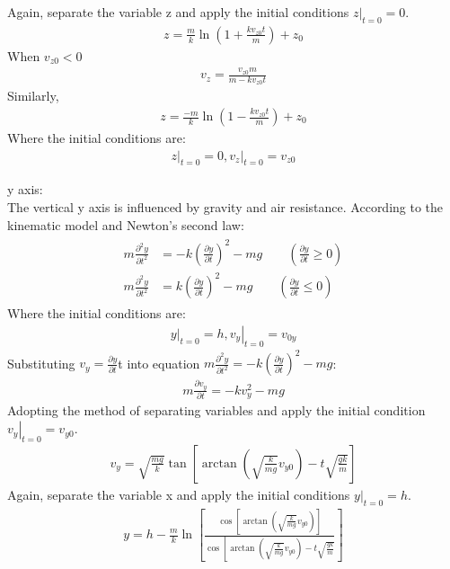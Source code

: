 Again, separate the variable z and apply the initial conditions $\left.z\right|_{t=0}=0$.
\begin{align}
     z=\frac{m}{k} \ln \left(1+\frac{k v_{z 0} t}{m}\right)+z_{0}   
\end{align}
When $v_{z 0}<0$
\begin{align}
    v_{z}=\frac{v_{z 0} m}{m-k v_{z 0} t}
\end{align}
Similarly,
\begin{align}
    z=\frac{-m}{k} \ln \left(1-\frac{k v_{z 0} t}{m}\right)+z_{0}
\end{align}
Where the initial conditions are:
\begin{align}
    \left.z\right|_{t=0}=0,\left.v_{z}\right|_{t=0}=v_{z 0}
\end{align}

y axis:\\
The vertical y axis is influenced by gravity and air resistance. According to the kinematic model and Newton’s second law:
\begin{align}
\begin{split}
   m \frac{\partial^{2} y}{\partial t^{2}}&=-k\left(\frac{\partial y}{\partial t}\right)^{2}-m g\qquad(\frac{\partial y}{\partial t} \geq 0)\\
   m \frac{\partial^{2} y}{\partial t^{2}}&=k\left(\frac{\partial y}{\partial t}\right)^{2}-m g\qquad(\frac{\partial y}{\partial t} \leq 0)
\end{split}
\end{align}
Where the initial conditions are:
\begin{align}
    \left.y\right|_{t=0}=h,\left.v_{y}\right|_{t=0}=v_{0 y}
\end{align}
Substituting $v_{y}=\frac{\partial y}{\partial t}$t into equation $m \frac{\partial^{2} y}{\partial t^{2}}=-k\left(\frac{\partial y}{\partial t}\right)^{2}-m g$:
\begin{align}
    m \frac{\partial v_{y}}{\partial t}=-k v_{y}^{2}-m g
\end{align}
Adopting the method of separating variables and apply the initial condition $\left.v_{y}\right|_{t=0}=v_{y 0}$.
\begin{align}
    v_{y}=\sqrt{\frac{m g}{k}} \tan \left[\arctan \left(\sqrt{\frac{k}{m g}} v_{y 0}\right)-t \sqrt{\frac{g k}{m}}\right]
\end{align}
Again, separate the variable x and apply the initial conditions $\left.y\right|_{t=0}=h$.
\begin{align}
    y=h-\frac{m}{k} \ln \left[\frac{\cos \left[\arctan \left(\sqrt{\frac{k}{m g}} v_{y 0}\right)\right]}{\cos \left[\arctan \left(\sqrt{\frac{k}{m g}} v_{y 0}\right)-t \sqrt{\frac{g k}{m}}\right.}\right]
\end{align}
